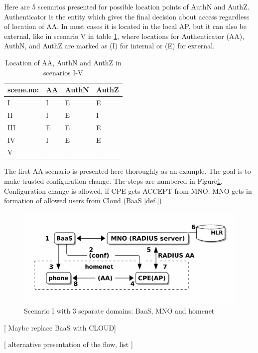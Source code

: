 \documentclass[12pt,a4paper,english]{tutthesis}
\begin{document}
\begin{otherlanguage}{english}
Here are  5 scenarios presented for possible location points of AuthN and 
AuthZ. Authenticator is the entity which gives the final decision 
about access regardless of location of AA.
In most cases it is located in the
local AP, but it can also be external, like in scenario V in 
table \ref{table-scenarios}, where locations for Authenticator (AA),
AuthN, and AuthZ are marked as (I) for internal or (E) for external.

\begin{table}[htb]
\caption{\label{table-scenarios}Location of AA, AuthN and AuthZ in scenarios I-V}
\centering
\begin{tabular}{llll}
scene.no: & AA & AuthN & AuthZ\\
\hline
I & I & E & E\\
II & I & E & I\\
III & E & E & E\\
IV & I & E & E\footnotemark\\
V & - & - & -\\
\end{tabular}
\end{table}


\label{scenario-i}
The first AA-scenario is presented here thoroughly as an example.
The goal is to make trusted configuration change. 
The steps are numbered in Figure\ref{fig:scenario-I}.
Configuration change is allowed, if CPE gets ACCEPT from MNO.  MNO gets
information of allowed users from Cloud (BaaS [def.])


\begin{figure}[htb]
\centering
\includegraphics[width=.9\linewidth]{scenI.png}
\caption{\label{fig:scenario-I}Scenario I with 3 separate domains: BaaS, MNO and homenet}
\end{figure}

[ Maybe replace BaaS with CLOUD] 


[ alternative presentation of the flow, list ] 


\end{otherlanguage}
\end{document}
